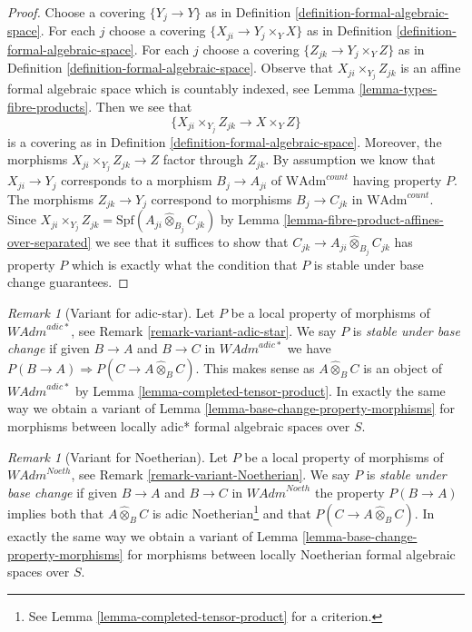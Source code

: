 \documentclass{stacks-project}
\theoremstyle{plain}
\theoremstyle{definition}
\theoremstyle{remark}
\newtheorem{remark}[subsection]{Remark}
\numberwithin{equation}{subsection}
\begin{document}
\begin{proof}
Choose a covering $\{Y_j \to Y\}$ as in
Definition \ref{definition-formal-algebraic-space}.
For each $j$ choose a covering $\{X_{ji} \to Y_j \times_Y X\}$
as in Definition \ref{definition-formal-algebraic-space}.
For each $j$ choose a covering $\{Z_{jk} \to Y_j \times_Y Z\}$
as in Definition \ref{definition-formal-algebraic-space}.
Observe that $X_{ji} \times_{Y_j} Z_{jk}$ is an
affine formal algebraic space which is countably indexed, see
Lemma \ref{lemma-types-fibre-products}.
Then we see that
$$
\{X_{ji} \times_{Y_j} Z_{jk} \to X \times_Y Z\}
$$
is a covering as in Definition \ref{definition-formal-algebraic-space}.
Moreover, the morphisms $X_{ji} \times_{Y_j} Z_{jk} \to Z$
factor through $Z_{jk}$. By assumption we know that
$X_{ji} \to Y_j$ corresponds to a morphism $B_j \to A_{ji}$ of
$\text{WAdm}^{count}$ having property $P$.
The morphisms $Z_{jk} \to Y_j$ correspond to morphisms $B_j \to C_{jk}$ in
$\text{WAdm}^{count}$. Since
$X_{ji} \times_{Y_j} Z_{jk} =
\text{Spf}(A_{ji} \widehat{\otimes}_{B_j} C_{jk})$
by Lemma \ref{lemma-fibre-product-affines-over-separated}
we see that it suffices to show that
$C_{jk} \to A_{ji} \widehat{\otimes}_{B_j} C_{jk}$
has property $P$ which is exactly what
the condition that $P$ is stable under base change guarantees.
\end{proof}

\begin{remark}[Variant for adic-star]
\label{remark-base-change-variant-adic-star}
Let $P$ be a local property of morphisms of $\textit{WAdm}^{adic*}$, see
Remark \ref{remark-variant-adic-star}. We say $P$ is {\it stable under
base change} if given $B \to A$ and $B \to C$ in $\textit{WAdm}^{adic*}$
we have $P(B \to A) \Rightarrow P(C \to A \widehat{\otimes}_B C)$.
This makes sense as $A \widehat{\otimes}_B C$ is an object of
$\textit{WAdm}^{adic*}$ by Lemma \ref{lemma-completed-tensor-product}.
In exactly the same way we obtain a variant of
Lemma \ref{lemma-base-change-property-morphisms}
for morphisms between locally adic* formal algebraic spaces over $S$.
\end{remark}

\begin{remark}[Variant for Noetherian]
\label{remark-base-change-variant-Noetherian}
Let $P$ be a local property of morphisms of $\textit{WAdm}^{Noeth}$, see
Remark \ref{remark-variant-Noetherian}. We say $P$ is
{\it stable under base change} if given $B \to A$ and $B \to C$
in $\textit{WAdm}^{Noeth}$ the property $P(B \to A)$
implies both that $A \widehat{\otimes}_B C$ is adic
Noetherian\footnote{See Lemma \ref{lemma-completed-tensor-product}
for a criterion.} and that
$P(C \to A \widehat{\otimes}_B C)$.
In exactly the same way we obtain a variant of
Lemma \ref{lemma-base-change-property-morphisms}
for morphisms between locally Noetherian formal algebraic spaces over $S$.
\end{remark}
\end{document}
